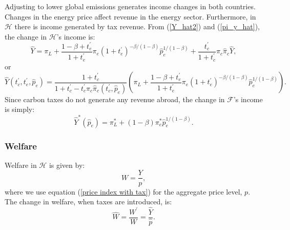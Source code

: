 \documentclass[notitlepage,12pt]{article}
\begin{document}
Adjusting to lower global emissions generates income changes in both
countries. Changes in the energy price affect revenue in the energy sector.
Furthermore, in $\mathcal{H}$ there is income generated by tax revenue. From
(\ref{Y_hat2}) and (\ref{pi_y_hat}), the change in $\mathcal{H}$'s income is:%
\begin{equation*}
\hat{Y}=\pi _{L}+\frac{1-\beta +t_{e}^{\prime }}{1+t_{e}^{\prime }}\pi
_{e}\left( 1+t_{e}^{\prime }\right) ^{-\beta /(1-\beta )}\hat{p}%
_{e}^{1/(1-\beta )}+\frac{t_{c}^{\prime }}{1+t_{c}^{\prime }}\pi _{c}\hat{\pi%
}_{c}\hat{Y},
\end{equation*}%
or%
\begin{equation}
\hat{Y}(t_{c}^{\prime },t_{e}^{\prime },\hat{p}_{e})=\frac{1+t_{c}^{\prime }%
}{1+t_{c}^{\prime }-t_{c}^{\prime }\pi _{c}\hat{\pi}_{c}(t_{c}^{\prime },%
\hat{p}_{e})}\left( \pi _{L}+\frac{1-\beta +t_{e}^{\prime }}{1+t_{e}^{\prime
}}\pi _{e}\left( 1+t_{e}^{\prime }\right) ^{-\beta /(1-\beta )}\hat{p}%
_{e}^{1/(1-\beta )}\right) .  \label{Yhat tax}
\end{equation}%
Since carbon taxes do not generate any revenue abroad, the change in $%
\mathcal{F}$'s income is simply:%
\begin{equation}
\hat{Y}^{\ast }(\hat{p}_{e})=\pi _{L}^{\ast }+\left( 1-\beta \right) \pi
_{e}^{\ast }\hat{p}_{e}^{1/(1-\beta )}.  \label{Ystarhat tax}
\end{equation}

\subsubsection{Welfare}

Welfare in $\mathcal{H}$ is given by:%
\begin{equation*}
W=\frac{Y}{p},
\end{equation*}%
where we use equation (\ref{price index with tax}) for the aggregate price
level, $p$. The change in welfare, when taxes are introduced, is:%
\begin{equation*}
\hat{W}=\frac{W^{\prime }}{W}=\frac{\hat{Y}}{\hat{p}}.
\end{equation*}
\end{document}
